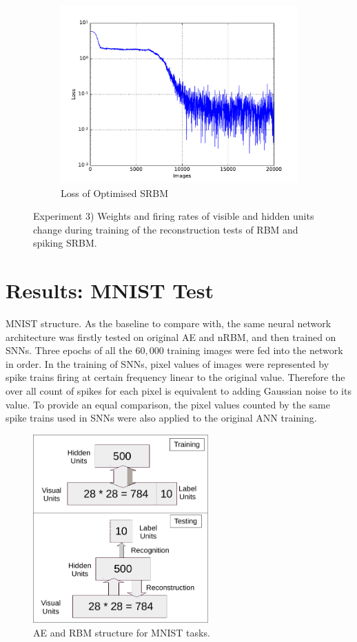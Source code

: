 \begin{figure}
\begin{subfigure}[t]{0.32\textwidth}
		\includegraphics[width=\textwidth]{pics_sdlm/17_exp_SRBM_all_long/exp3_mse_nons_2.pdf}
		\caption{Loss of Optimised SRBM}
	\end{subfigure}
	\caption{Experiment 3) Weights and firing rates of visible and hidden units change during training of the reconstruction tests of RBM and spiking SRBM.}
\end{figure}


\section{Results: MNIST Test}
MNIST structure.
As the baseline to compare with, the same neural network architecture was firstly tested on original AE and nRBM, and then trained on SNNs.
Three epochs of all the $60,000$ training images were fed into the network in order.
In the training of SNNs, pixel values of images were represented by spike trains firing at certain frequency linear to the original value.
Therefore the over all count of spikes for each pixel is equivalent to adding Gaussian noise to its value.
To provide an equal comparison, the pixel values counted by the same spike trains used in SNNs were also applied to the original ANN training.
\begin{figure}
	\centering
	\includegraphics[width=0.6\textwidth]{pics_sdlm/mnist.pdf}
	\caption{AE and RBM structure for MNIST tasks.}
	\label{fig:MNSIT}
\end{figure}
